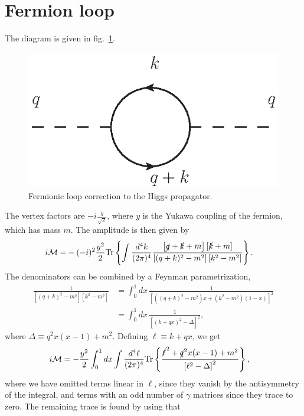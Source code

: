 \documentclass[twoside,english]{uiofysmaster}
\begin{document}
\section{Fermion loop}
The diagram is given in fig.\ \ref{fig:appendix_higgs_top_loop}.
\begin{figure}[hbt]
\centering
\includegraphics[scale=1]{figures/appendix/higgs_top_loop_with_momenta.eps}
\caption{Fermionic loop correction to the Higgs propagator.}
\label{fig:appendix_higgs_top_loop}
\end{figure}
The vertex factors are $-i\frac{y}{\sqrt{2}}$, where $y$ is the Yukawa coupling of the fermion, which has mass $m$. The amplitude is then given by
\begin{align}
	i\mathcal{M} =& -(-i)^2\frac{y^2}{2} \mathrm{Tr}\left\{ \int \frac{d^4 k}{(2\pi)^4} \frac{\left[ \slashed q + \slashed k + m \right]\left[ \slashed k + m \right]}{\left[(q+k)^2 - m^2 \right] \left[ k^2 - m^2 \right]}  \right\}.
\end{align}
The denominators can be combined by a Feynman parametrization,
\begin{align}
	\frac{1}{\left[(q+k)^2 - m^2 \right] \left[ k^2 - m^2 \right]} &= \int_0^1 dx\, \frac{1}{\left[\left( (q+k)^2 - m^2\right) x + \left(k^2 -m^2 \right)(1-x)\right]^2}\nonumber \\
	&= \int_0^1 dx \, \frac{1}{\left[(k+qx)^2 - \Delta\right]^2},
\end{align}
where $\Delta \equiv q^2x(x-1)+m^2$. Defining $\ell \equiv k+qx$, we get
\begin{align}
	i\mathcal{M} &= -\frac{y^2}{2}\int_0^1 dx \int \frac{d^4\ell}{(2\pi)^4} \mathrm{Tr}\left\{ \frac{ \slashed{\ell}^2 + \slashed{q}^2x(x-1) + m^2}{\left[ \ell^2 - \Delta \right]^2}  \right\},
\end{align}
where we have omitted terms linear in $\ell$, since they vanish by the antisymmetry of the integral, and terms with an odd number of $\gamma$ matrices since they trace to zero. The remaining trace is found by using that
\end{document}

